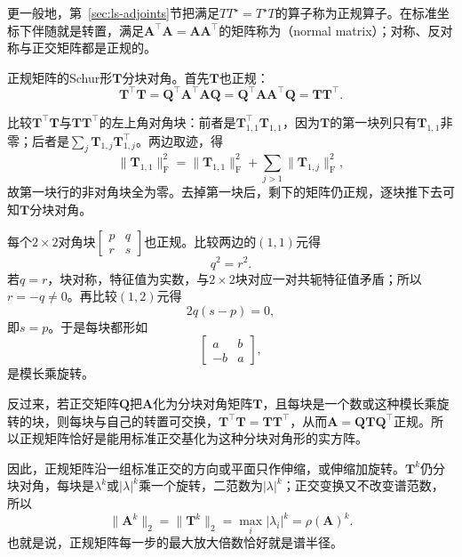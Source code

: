 更一般地，第~\ref{sec:ls-adjoints}节把满足$TT^\star=T^\star T$的算子称为正规算子。在标准坐标下伴随就是转置，满足$\bm A^\top\bm A=\bm A\bm A^\top$的矩阵称为（normal matrix）；对称、反对称与正交矩阵都是正规的。

正规矩阵的Schur形$\bm T$分块对角。首先$\bm T$也正规：
\[
 \bm T^\top\bm T=\bm Q^\top\bm A^\top\bm A\bm Q=\bm Q^\top\bm A\bm A^\top\bm Q=\bm T\bm T^\top .
\]

比较$\bm T^\top\bm T$与$\bm T\bm T^\top$的左上角对角块：前者是$\bm T_{1,1}^\top\bm T_{1,1}$，因为$\bm T$的第一块列只有$\bm T_{1,1}$非零；后者是$\sum_j\bm T_{1,j}\bm T_{1,j}^\top$。两边取迹，得
\[
 \lVert\bm T_{1,1}\rVert_{\mathrm F}^2=\lVert\bm T_{1,1}\rVert_{\mathrm F}^2+\sum_{j>1}\lVert\bm T_{1,j}\rVert_{\mathrm F}^2 ,
\]
故第一块行的非对角块全为零。去掉第一块后，剩下的矩阵仍正规，逐块推下去可知$\bm T$分块对角。

每个$2\times2$对角块$\left[\begin{smallmatrix}p&q\\r&s\end{smallmatrix}\right]$也正规。比较两边的$(1,1)$元得
\[
 q^2=r^2 .
\]
若$q=r$，块对称，特征值为实数，与$2\times2$块对应一对共轭特征值矛盾；所以$r=-q\neq0$。再比较$(1,2)$元得
\[
 2q(s-p)=0,
\]
即$s=p$。于是每块都形如
\[
 \begin{bmatrix}a&b\\-b&a\end{bmatrix},
\]
是模长乘旋转。

反过来，若正交矩阵$\bm Q$把$\bm A$化为分块对角矩阵$\bm T$，且每块是一个数或这种模长乘旋转的块，则每块与自己的转置可交换，$\bm T^\top\bm T=\bm T\bm T^\top$，从而$\bm A=\bm Q\bm T\bm Q^\top$正规。所以正规矩阵恰好是能用标准正交基化为这种分块对角形的实方阵。

因此，正规矩阵沿一组标准正交的方向或平面只作伸缩，或伸缩加旋转。$\bm T^k$仍分块对角，每块是$\lambda^k$或$|\lambda|^k$乘一个旋转，二范数为$|\lambda|^k$；正交变换又不改变谱范数，所以
\[
 \lVert\bm A^k\rVert_2=\lVert\bm T^k\rVert_2=\max_i|\lambda_i|^k=\rho(\bm A)^k .
\]
也就是说，正规矩阵每一步的最大放大倍数恰好就是谱半径。

